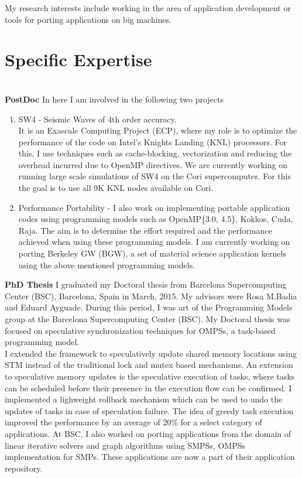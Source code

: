\documentclass[10pt,stdletter,dateno]{newlfm}
\begin{document}
\begin{newlfm}
My research interests include working in the area of application development or tools for porting applications on big machines.


\section{Specific Expertise}\\
\textbf{PostDoc}
    In here I am involved in the following two projects
\begin{enumerate}
\item {SW4} - Seismic Waves of 4th order accuracy. \\
    It is an Exascale Computing Project (ECP), where my role is to optimize the  performance of the code on Intel's Knights Landing (KNL) processors.
    For this, I use techniques such as cache-blocking, vectorization and reducing the overhead incurred due to OpenMP directives.
    We are currently working on running large scale simulations of SW4 on the Cori supercomputer. For this the goal is to use all 9K KNL nodes available on Cori.

\item {Performance Portability} - I also work on implementing portable application codes using programming models such as OpenMP\{3.0, 4.5\}, Kokkos, Cuda, Raja.
    The aim is to determine the effort required and the performance achieved when using these programming models.
    I am currently working on porting Berkeley GW (BGW), a set of material science application kernels using the above mentioned programming models.
\end{enumerate}
\textbf{PhD Thesis}
I graduated my Doctoral thesis from Barcelona Supercomputing Center (BSC), Barcelona, Spain in March, 2015.
My advisors were Rosa M.Badia and Eduard Ayguade.
During this period, I was art of the Programming Models group at the Barcelona Supercomputing Center (BSC).
My Doctoral thesis was focused on speculative synchronization techniques for OMPSs, a task-based programming model.\\

I extended the framework to speculatively update shared memory locations using STM instead of the traditional lock and mutex based mechanisms.
An extension to speculative memory updates is the speculative execution of tasks, where tasks can be scheduled before their presence in the execution flow can be confirmed.
I implemented a lighweight rollback mechanism which can be used to undo the updates of tasks in case of speculation failure.
The idea of greedy task execution improved the performance by an average of 20\% for a select category of applications.
At BSC, I also worked on porting applications from the domain of linear iterative solvers and graph algorithms using SMPSs, OMPSs implementation for SMPs.
These applications are now a part of their application repository.


\end{newlfm}
\end{document}
